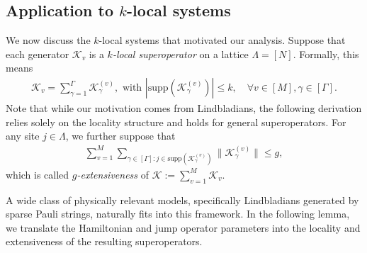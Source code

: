 \documentclass[aps,pra,reprint,groupedaddress,floatfix]{revtex4-2}
\newcommand{\supp}{\mathrm{supp}}
\newcommand{\mc}{\mathcal}
\begin{document}
\subsection{Application to $k$-local systems}\label{append:k-local-example}

We now discuss the $k$-local systems that motivated our analysis. Suppose that each generator $\mc K_v$ is a \emph{$k$-local superoperator} on a lattice $\Lambda = [N]$. Formally, this means
\begin{align*}
    \mc K_v = \sum_{\gamma = 1}^{\Gamma} \mc K_{\gamma}^{(v)}, \text{ with } |\supp(\mc K_{\gamma}^{(v)} )|\le k, \quad \forall v\in [M], \gamma\in [\Gamma].
\end{align*} 
Note that while our motivation comes from Lindbladians, the following derivation relies solely on the locality structure and holds for general superoperators.
For any site $j\in \Lambda$, we further suppose that 
\begin{align*}
    \sum_{v=1}^M\sum_{\gamma\in [\Gamma]: j\in \supp(\mc K_{\gamma}^{(v)})}\|\mc K_\gamma^{(v)}\|\le g,
\end{align*}
which is called \emph{$g$-extensiveness} of $\mc K:= \sum_{v=1}^M \mc K_v$.

A wide class of physically relevant models, specifically Lindbladians generated by sparse Pauli strings, naturally fits into this framework. In the following lemma, we translate the Hamiltonian and jump operator parameters into the locality and extensiveness of the resulting superoperators.
\end{document}
